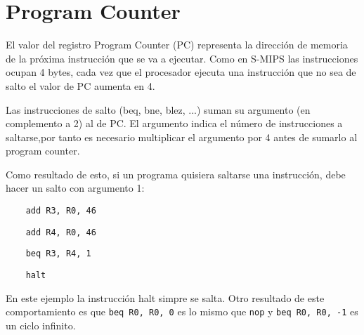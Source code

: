 \documentclass[letterpaper,11pt]{scrartcl}
\begin{document}











\section*{Program Counter}

  El valor del registro Program Counter (PC) representa la dirección de memoria de la
  próxima instrucción que se va a ejecutar. Como en S-MIPS las instrucciones
  ocupan 4 bytes, cada vez que el procesador ejecuta una instrucción que no sea
  de salto el valor de PC aumenta en 4.
  
  Las instrucciones de salto (beq, bne, blez, ...) suman su argumento (en complemento a 2) al de PC.
  El argumento indica el número de instrucciones a saltarse,por tanto es necesario multiplicar el 
  argumento por 4 antes de sumarlo al program counter.
  
  Como resultado de esto, si un programa quisiera saltarse una instrucción, debe
  hacer un salto con argumento 1:
  
  \verb|    add R3, R0, 46 |
  
  \verb|    add R4, R0, 46 |

  \verb|    beq R3, R4, 1 |

  \verb|    halt |

  En este ejemplo la instrucción halt simpre se salta. Otro resultado de este comportamiento 
  es que \verb|beq R0, R0, 0| es lo mismo que \verb|nop| y \verb|beq R0, R0, -1| es un ciclo infinito.
\end{document}
